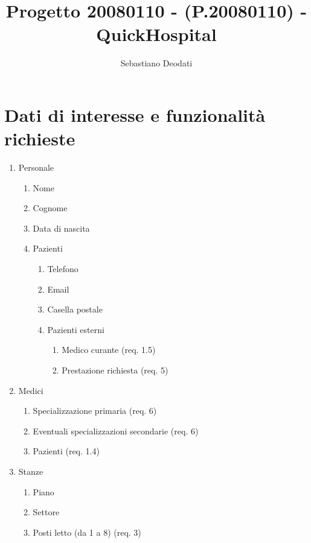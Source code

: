 \documentclass[a4paper,12pt]{report}
\title{Progetto 20080110 - (P.20080110) - QuickHospital}
\author{Sebastiano Deodati}
\begin{document}
  \maketitle
  \tableofcontents

  \chapter{Dati di interesse e funzionalità richieste}
    \begin{enumerate}[label*=\arabic*.]
        \item Personale
        \begin{enumerate}[label*=\arabic*.]
            \item Nome
            \item Cognome
            \item Data di nascita
            \item Pazienti
            \begin{enumerate}[label*=\arabic*.]
                \item Telefono
                \item Email
                \item Casella postale
                \item Pazienti esterni
                \begin{enumerate}[label*=\arabic*.]
                    \item Medico curante (req. 1.5)
                    \item Prestazione richiesta (req. 5)
                \end{enumerate}
            \end{enumerate}
        \end{enumerate}
        \item Medici
        \begin{enumerate}[label*=\arabic*.]
            \item Specializzazione primaria (req. 6)
            \item Eventuali specializzazioni secondarie (req. 6)
            \item Pazienti (req. 1.4)
        \end{enumerate}
        \item Stanze
        \begin{enumerate}[label*=\arabic*.]
            \item Piano
            \item Settore
            \item Posti letto (da 1 a 8) (req. 3)

\end{enumerate}
\end{enumerate}
\end{document}
